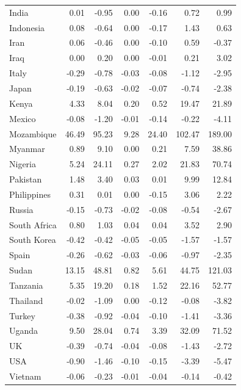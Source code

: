 \begin{table}[h]
\begin{tabular}[t]{lrrrrrr}
India & 0.01 & -0.95 & 0.00 & -0.16 & 0.72 & 0.99\\
Indonesia & 0.08 & -0.64 & 0.00 & -0.17 & 1.43 & 0.63\\
Iran & 0.06 & -0.46 & 0.00 & -0.10 & 0.59 & -0.37\\
Iraq & 0.00 & 0.20 & 0.00 & -0.01 & 0.21 & 3.02\\
Italy & -0.29 & -0.78 & -0.03 & -0.08 & -1.12 & -2.95\\
Japan & -0.19 & -0.63 & -0.02 & -0.07 & -0.74 & -2.38\\
Kenya & 4.33 & 8.04 & 0.20 & 0.52 & 19.47 & 21.89\\
Mexico & -0.08 & -1.20 & -0.01 & -0.14 & -0.22 & -4.11\\
Mozambique & 46.49 & 95.23 & 9.28 & 24.40 & 102.47 & 189.00\\
Myanmar & 0.89 & 9.10 & 0.00 & 0.21 & 7.59 & 38.86\\
Nigeria & 5.24 & 24.11 & 0.27 & 2.02 & 21.83 & 70.74\\
Pakistan & 1.48 & 3.40 & 0.03 & 0.01 & 9.99 & 12.84\\
Philippines & 0.31 & 0.01 & 0.00 & -0.15 & 3.06 & 2.22\\
Russia & -0.15 & -0.73 & -0.02 & -0.08 & -0.54 & -2.67\\
South Africa & 0.80 & 1.03 & 0.04 & 0.04 & 3.52 & 2.90\\
South Korea & -0.42 & -0.42 & -0.05 & -0.05 & -1.57 & -1.57\\
Spain & -0.26 & -0.62 & -0.03 & -0.06 & -0.97 & -2.35\\
Sudan & 13.15 & 48.81 & 0.82 & 5.61 & 44.75 & 121.03\\
Tanzania & 5.35 & 19.20 & 0.18 & 1.52 & 22.16 & 52.77\\
Thailand & -0.02 & -1.09 & 0.00 & -0.12 & -0.08 & -3.82\\
Turkey & -0.38 & -0.92 & -0.04 & -0.10 & -1.41 & -3.36\\
Uganda & 9.50 & 28.04 & 0.74 & 3.39 & 32.09 & 71.52\\
UK & -0.39 & -0.74 & -0.04 & -0.08 & -1.43 & -2.72\\
USA & -0.90 & -1.46 & -0.10 & -0.15 & -3.39 & -5.47\\
Vietnam & -0.06 & -0.23 & -0.01 & -0.04 & -0.14 & -0.42\\
\bottomrule
\end{tabular}
\end{table}